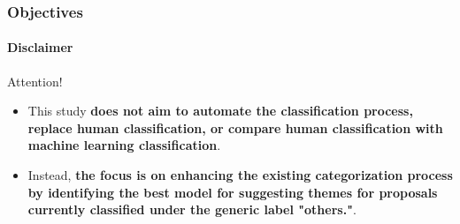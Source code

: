 \begin{frame}
	\frametitle{Objectives}
	\framesubtitle{Disclaimer}
		
	\begin{alertblock}{Attention!} 
		\begin{itemize}
			\item This study \textbf{does not aim to automate the classification process, replace human classification, or compare human classification with machine learning classification}. 
			
			\item Instead, \textbf{the focus is on enhancing the existing categorization process by identifying the best model for suggesting themes for proposals currently classified under the generic label "others."}.
		\end{itemize}
	\end{alertblock}
	
	
	
\end{frame}





